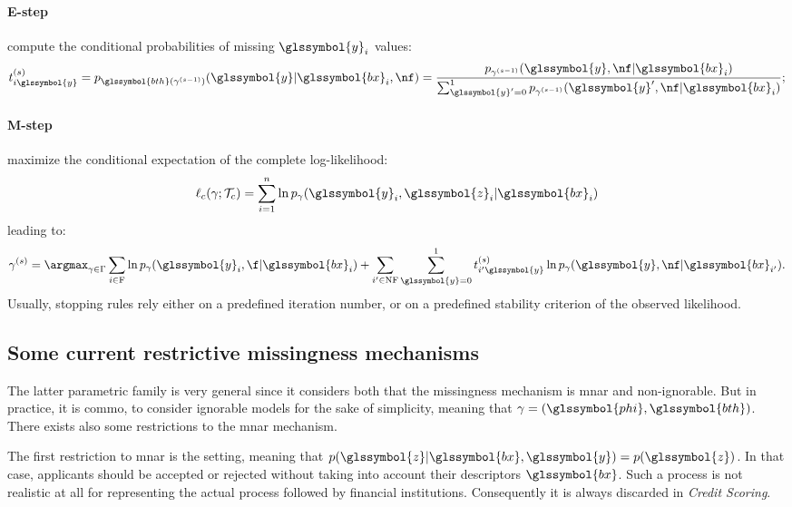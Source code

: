 \paragraph{E-step} compute the conditional probabilities of missing $\glssymbol{y}_i$ values:
\begin{equation}
t_{i\glssymbol{y}}^{(s)} = p_{\glssymbol{bth}(\gamma^{(s-1)})}(\glssymbol{y}|\glssymbol{bx}_i,\nf) = \frac{p_{\gamma^{(s-1)}}(\glssymbol{y}, \nf|\glssymbol{bx}_i)}{\sum_{\glssymbol{y}' = 0}^{1} p_{\gamma^{(s-1)}}(\glssymbol{y}', \nf|\glssymbol{bx}_i)};
\end{equation}
\paragraph{M-step} maximize the conditional expectation of the complete log-likelihood:
\begin{equation}\label{eq:like.c}
\ell_c(\gamma;\mathcal{T}_c) = \sum_{i=1}^n\ln p_{\gamma}(\glssymbol{y}_i,\glssymbol{z}_i | \glssymbol{bx}_i)
\end{equation}
leading to:
\begin{equation}
\gamma^{(s)} = \argmax_{\gamma \in \Gamma} \sum_{i\in \text{F}} \ln p_{\gamma}(\glssymbol{y}_i, \f|\glssymbol{bx}_i) +  \sum_{i'\in \text{NF}}\sum_{\glssymbol{y} = 0}^{1}t_{i'\glssymbol{y}}^{(s)} \ln p_{\gamma}(\glssymbol{y}, \nf | \glssymbol{bx}_{i'}).
\end{equation}
Usually, stopping rules rely either on a predefined iteration number, or on a predefined stability criterion of the observed likelihood.

\subsection{Some current restrictive missingness mechanisms}
\label{sec:mechanisms}

The latter parametric family is very general since it considers both that the missingness mechanism is \gls{mnar} and non-ignorable. But in practice, it is commo, to consider ignorable models for the sake of simplicity, meaning that $\gamma= (\glssymbol{phi},\glssymbol{bth})$. There exists also some restrictions to the \gls{mnar} mechanism. 

The first restriction to \gls{mnar} is the setting, meaning that $p(\glssymbol{z}| \glssymbol{bx},\glssymbol{y}) = p(\glssymbol{z})$. In that case, applicants should be accepted or rejected without taking into account their descriptors $\glssymbol{bx}$. Such a process is not realistic at all for representing the actual process followed by financial institutions. Consequently it is always discarded in \textit{Credit Scoring}.

